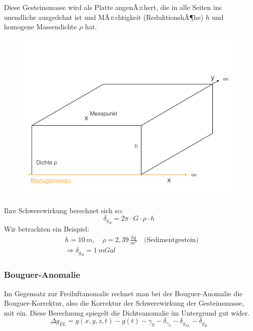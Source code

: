 Diese Gesteinsmasse wird als Platte angenÃ¤hert, die in alle Seiten ins unendliche ausgedehnt ist und MÃ¤chtigkeit (ReduktionshÃ¶he) $h$ und homogene Massendichte $\rho$ hat. 

\begin{figure}[H]
	\centering
	\includegraphics[width = \textwidth]{GravimetrieBilder/Bouguer-Reduktion2}
\end{figure}

Ihre Schwerewirkung berechnet sich so: \begin{equation*}
	\delta_{g_B} = 2 \pi \cdot G \cdot \rho \cdot h
\end{equation*}
Wir betrachten ein Beispiel: \begin{align*}
	&h = 10\,\si{m}, \quad \rho = 2,39\,\si{\frac{kg}{m^3}} \quad \text{(Sedimentgestein)}\\
	&\Rightarrow \delta_{g_B} = 1\,\si{m Gal}
\end{align*}

\subsubsection{Bouguer-Anomalie}
Im Gegensatz zur Freiluftanomalie rechnet man bei der Bouguer-Anomalie die Bouguer-Korrektur, also die Korrektur der Schwerewirkung der Gesteinsmasse, mit ein. Diese Berechnung spiegelt die Dichteanomalie im Untergrund gut wider. \begin{equation*}
	\Delta g_{FL} = g(x, y, z, t) - g(t) - \gamma_0 - \delta_{\gamma_0} - \delta_{g_{FL}} - \delta_{g_B}
\end{equation*} 

